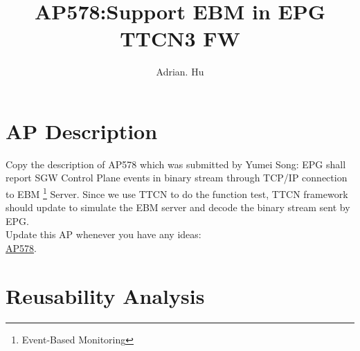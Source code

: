 \documentclass[a4paper,11pt]{article}
\author{Adrian. Hu}
\title{AP578:Support EBM in EPG TTCN3 FW}
\begin{document}
\maketitle
\tableofcontents

\section{AP Description}
Copy the description of AP578 which was submitted by Yumei Song:
\newline EPG shall report SGW Control Plane events in binary stream through TCP/IP connection to EBM \footnote{Event-Based Monitoring} Server. Since we use TTCN to do the function test, TTCN framework should update to simulate the EBM server and decode the binary stream sent by EPG.\\
Update this AP whenever you have any ideas:\\
\href{http://eteggsnit01.seln.ete.ericsson.se/redmine/issues/578}{AP578}.
\section{Reusability Analysis}
\end{document}
